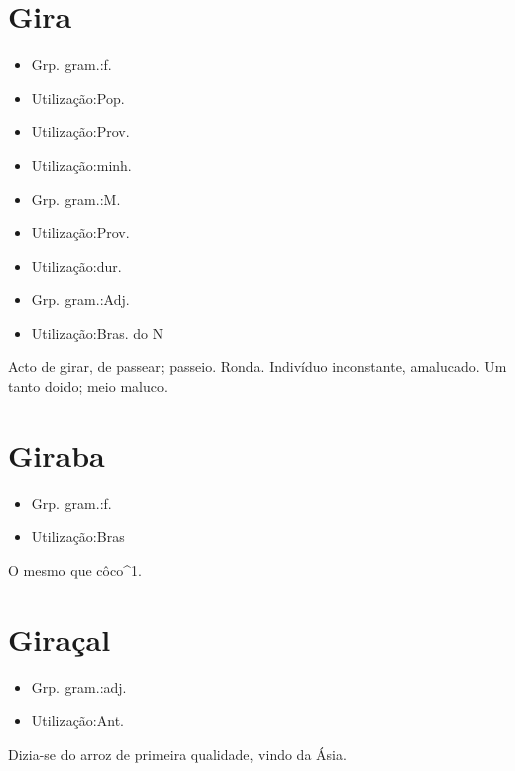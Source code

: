\section{Gira}
\begin{itemize}
\item {Grp. gram.:f.}
\end{itemize}
\begin{itemize}
\item {Utilização:Pop.}
\end{itemize}
\begin{itemize}
\item {Utilização:Prov.}
\end{itemize}
\begin{itemize}
\item {Utilização:minh.}
\end{itemize}
\begin{itemize}
\item {Grp. gram.:M.}
\end{itemize}
\begin{itemize}
\item {Utilização:Prov.}
\end{itemize}
\begin{itemize}
\item {Utilização:dur.}
\end{itemize}
\begin{itemize}
\item {Grp. gram.:Adj.}
\end{itemize}
\begin{itemize}
\item {Utilização:Bras. do N}
\end{itemize}
Acto de girar, de passear; passeio.
Ronda.
Indivíduo inconstante, amalucado.
Um tanto doido; meio maluco.
\section{Giraba}
\begin{itemize}
\item {Grp. gram.:f.}
\end{itemize}
\begin{itemize}
\item {Utilização:Bras}
\end{itemize}
O mesmo que \textunderscore côco\textunderscore ^1.
\section{Giraçal}
\begin{itemize}
\item {Grp. gram.:adj.}
\end{itemize}
\begin{itemize}
\item {Utilização:Ant.}
\end{itemize}
Dizia-se do arroz de primeira qualidade, vindo da Ásia.
